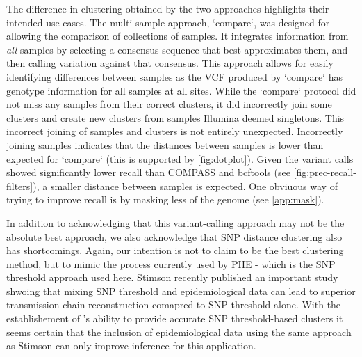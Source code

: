 The difference in clustering obtained by the two \pandora{} approaches highlights their intended use cases. The multi-sample approach, `compare`, was designed for allowing the comparison of collections of samples. It integrates information from \emph{all} samples by selecting a consensus sequence that best approximates them, and then calling variation against that consensus. This approach allows for easily identifying differences between samples as the VCF produced by `compare` has genotype information for all samples at all sites. While the `compare` protocol did not miss any samples from their correct clusters, it did incorrectly join some clusters and create new clusters from samples Illumina deemed singletons. This incorrect joining of samples and clusters is not entirely unexpected. Incorrectly joining samples indicates that the distances between samples is lower than expected for `compare` (this is supported by \autoref{fig:dotplot}). Given the \pandora{} variant calls showed significantly lower recall than COMPASS and bcftools (see \autoref{fig:prec-recall-filters}), a smaller distance between samples is expected. One obviuous way of trying to improve recall is by masking less of the genome (see \autoref{app:mask}). 

In addition to acknowledging that this variant-calling approach may not be the absolute best approach, we also acknowledge that SNP distance clustering also has shortcomings. Again, our intention is not to claim to be the best clustering method, but to mimic the process currently used by PHE - which is the SNP threshold approach used here. Stimson \etal{} recently published an important study shwoing that mixing SNP threshold and epidemiological data can lead to superior transmission chain reconstruction comapred to SNP threshold alone. With the establishement of \ont{}'s ability to provide accurate SNP threshold-based clusters it seems certain that the inclusion of epidemiological data using the same approach as Stimson \etal{} can only improve inference for this application.

